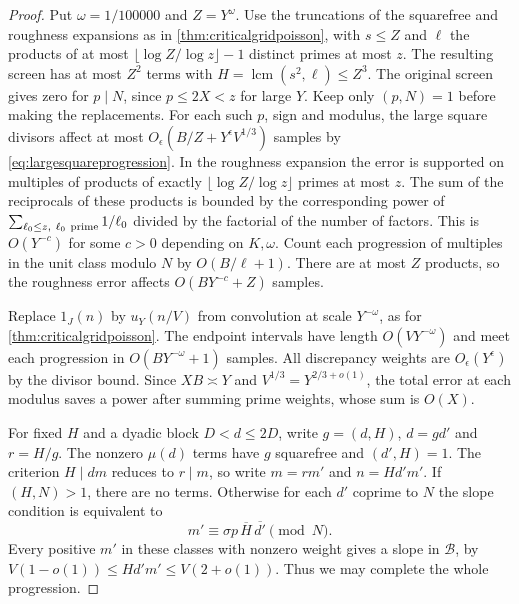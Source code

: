 \documentclass[11pt,a4paper]{article}
\numberwithin{equation}{section}
\begin{document}
\begin{proof}
Put $\omega=1/100000$ and $Z=Y^\omega$. Use the
truncations of the squarefree and roughness expansions
as in \cref{thm:criticalgridpoisson}, with $s\le Z$
and $\ell$ the products of at most
$\lfloor\log Z/\log z\rfloor-1$ distinct primes
at most $z$. The resulting screen has at most
$Z^2$ terms with $H=\operatorname{lcm}(s^2,\ell)\le Z^3$.
The original screen gives zero for $p\mid N$, since
$p\le2X<z$ for large $Y$. Keep only $(p,N)=1$ before
making the replacements. For each such $p$, sign and
modulus, the large square divisors affect at most
$O_\epsilon(B/Z+Y^\epsilon V^{1/3})$ samples by
\cref{eq:largesquareprogression}. In the roughness
expansion the error is supported on multiples
of products of exactly $\lfloor\log Z/\log z\rfloor$
primes at most $z$. The sum of the reciprocals
of these products is bounded by the corresponding
power of $\sum_{\ell_0\le z,\ \ell_0\ {\rm prime}}1/\ell_0$
divided by the factorial of the number of factors.
This is $O(Y^{-c})$ for some $c>0$ depending on
$K,\omega$. Count each progression of multiples
in the unit class modulo $N$ by $O(B/\ell+1)$.
There are at most $Z$ products, so the roughness
error affects $O(BY^{-c}+Z)$ samples.

Replace $1_J(n)$ by $u_Y(n/V)$ from convolution at
scale $Y^{-\omega}$, as for
\cref{thm:criticalgridpoisson}. The endpoint intervals
have length $O(VY^{-\omega})$ and meet each
progression in $O(BY^{-\omega}+1)$ samples.
All discrepancy weights are $O_\epsilon(Y^\epsilon)$
by the divisor bound. Since $XB\asymp Y$ and
$V^{1/3}=Y^{2/3+o(1)}$, the total error at each
modulus saves a power after summing prime weights,
whose sum is $O(X)$.

For fixed $H$ and a dyadic block
$D<d\le2D$, write $g=(d,H)$, $d=g d'$ and
$r=H/g$. The nonzero $\mu(d)$ terms have $g$
squarefree and $(d',H)=1$. The criterion $H\mid dm$
reduces to $r\mid m$, so write $m=r m'$ and
$n=H d'm'$. If $(H,N)>1$, there are no terms.
Otherwise for each $d'$ coprime to $N$ the slope
condition is equivalent to
\[
 m'\equiv \sigma p\,\overline H\,\overline{d'}
                                \pmod N.
\]
Every positive $m'$ in these classes with nonzero
weight gives a slope in $\mathcal B$, by
$V(1-o(1))\le H d'm'\le V(2+o(1))$.
Thus we may complete the whole progression.


\end{proof}
\end{document}
